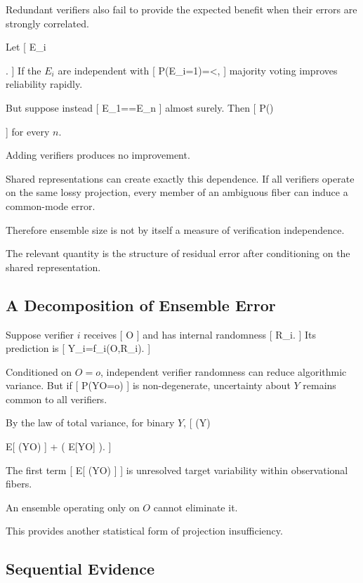 \documentclass[11pt]{article}
\begin{document}
Redundant verifiers also fail to provide the expected benefit when their errors are strongly correlated.

Let
[
E_i

.
]
If the $E_i$ are independent with
[
P(E_i=1)=\varepsilon<,
]
majority voting improves reliability rapidly.

But suppose instead
[
E_1=\cdots=E_n
]
almost surely. Then
[
P()

\varepsilon
]
for every $n$.

Adding verifiers produces no improvement.

Shared representations can create exactly this dependence. If all verifiers operate on the same lossy projection, every member of an ambiguous fiber can induce a common-mode error.

Therefore ensemble size is not by itself a measure of verification independence.

The relevant quantity is the structure of residual error after conditioning on the shared representation.

\subsection{A Decomposition of Ensemble Error}

Suppose verifier $i$ receives
[
O
]
and has internal randomness
[
R_i.
]
Its prediction is
[
\widehat Y_i=f_i(O,R_i).
]

Conditioned on $O=o$, independent verifier randomness can reduce algorithmic variance. But if
[
P(Y\mid O=o)
]
is non-degenerate, uncertainty about $Y$ remains common to all verifiers.

By the law of total variance, for binary $Y$,
[
(Y)

\mathbb E[
(Y\mid O)
]
+
(
\mathbb E[Y\mid O]
).
]

The first term
[
\mathbb E[
(Y\mid O)
]
]
is unresolved target variability within observational fibers.

An ensemble operating only on $O$ cannot eliminate it.

This provides another statistical form of projection insufficiency.

\subsection{Sequential Evidence}
\end{document}
